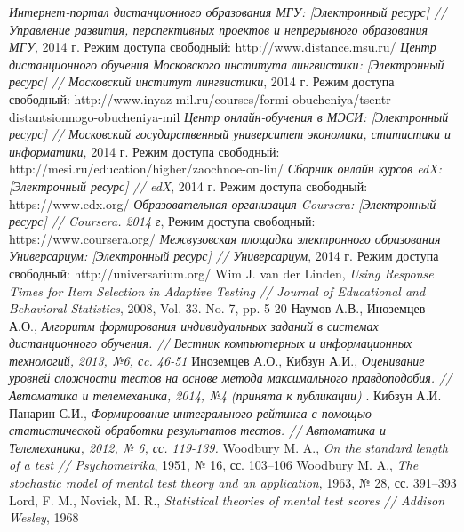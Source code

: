 \renewcommand{\bibname}{Список использованных источников}

\begin{thebibliography}{2}
  {\itshape Интернет-портал дистанционного образования МГУ: [Электронный ресурс] // Управление развития, перспективных проектов и непрерывного образования МГУ}, 2014 г. Режим доступа свободный: http://www.distance.msu.ru/
  {\itshape Центр дистанционного обучения Московского института лингвистики: [Электронный ресурс] // Московский институт лингвистики}, 2014 г. Режим доступа свободный: http://www.inyaz-mil.ru/courses/formi-obucheniya/tsentr-distantsionnogo-obucheniya-mil
  {\itshape Центр онлайн-обучения в МЭСИ: [Электронный ресурс] // Московский государственный университет экономики, статистики и информатики}, 2014 г. Режим доступа свободный: http://mesi.ru/education/higher/zaochnoe-on-lin/
  {\itshape Сборник онлайн курсов edX: [Электронный ресурс] // edX}, 2014 г. Режим доступа свободный: https://www.edx.org/
  {\itshape Образовательная организация Coursera: [Электронный ресурс] // Coursera. 2014 г}, Режим доступа свободный: https://www.coursera.org/
  {\itshape Межвузовская площадка электронного образования Универсариум: [Электронный ресурс] // Универсариум}, 2014 г. Режим доступа свободный: http://universarium.org/
 Wim J. van der Linden, {\itshape Using Response Times for Item Selection in Adaptive Testing // Journal of Educational and Behavioral Statistics}, 2008, Vol. 33. No. 7, pp. 5-20
 Наумов А.В., Иноземцев А.О., {\itshape Алгоритм формирования индивидуальных заданий в системах дистанционного обучения. // Вестник компьютерных и информационных технологий, 2013, №6, сc. 46-51}
 Иноземцев А.О., Кибзун А.И., {\itshape  Оценивание уровней сложности тестов на основе метода максимального правдоподобия. // Автоматика и телемеханика, 2014, №4 (принята к публикации) }.
 Кибзун А.И. Панарин С.И., {\itshape Формирование интегрального рейтинга с помощью статистической обработки результатов тестов. // Автоматика и Телемеханика, 2012, № 6, сс. 119-139.}
 Woodbury M. A., {\itshape On the standard length of a test // Psychometrika}, 1951, № 16, сс. 103–106
 Woodbury M. A., {\itshape The stochastic model of mental test theory and an application}, 1963, № 28, сс. 391–393
 Lord, F. M., Novick, M. R., {\itshape Statistical theories of mental test scores // Addison Wesley}, 1968

\end{thebibliography}

